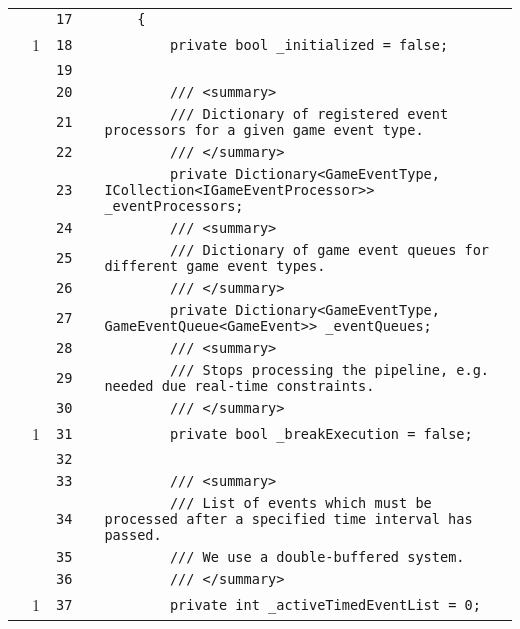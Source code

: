 \documentclass[a4paper,landscape,10pt]{article}
\begin{document}
\begin{longtable}[l]{lrrll}
\cellcolor{gray} &  & \verb~17~ & & \verb~    {~\\
\cellcolor{green} & 1 & \verb~18~ & & \verb~        private bool _initialized = false;~\\
\cellcolor{gray} &  & \verb~19~ & & \verb~~\\
\cellcolor{gray} &  & \verb~20~ & & \verb~        /// <summary>~\\
\cellcolor{gray} &  & \verb~21~ & & \verb~        /// Dictionary of registered event processors for a given game event type.~\\
\cellcolor{gray} &  & \verb~22~ & & \verb~        /// </summary>~\\
\cellcolor{gray} &  & \verb~23~ & & \verb~        private Dictionary<GameEventType, ICollection<IGameEventProcessor>> _eventProcessors;~\\
\cellcolor{gray} &  & \verb~24~ & & \verb~        /// <summary>~\\
\cellcolor{gray} &  & \verb~25~ & & \verb~        /// Dictionary of game event queues for different game event types.~\\
\cellcolor{gray} &  & \verb~26~ & & \verb~        /// </summary>~\\
\cellcolor{gray} &  & \verb~27~ & & \verb~        private Dictionary<GameEventType, GameEventQueue<GameEvent>> _eventQueues;~\\
\cellcolor{gray} &  & \verb~28~ & & \verb~        /// <summary>~\\
\cellcolor{gray} &  & \verb~29~ & & \verb~        /// Stops processing the pipeline, e.g. needed due real-time constraints.~\\
\cellcolor{gray} &  & \verb~30~ & & \verb~        /// </summary>~\\
\cellcolor{green} & 1 & \verb~31~ & & \verb~        private bool _breakExecution = false;~\\
\cellcolor{gray} &  & \verb~32~ & & \verb~~\\
\cellcolor{gray} &  & \verb~33~ & & \verb~        /// <summary>~\\
\cellcolor{gray} &  & \verb~34~ & & \verb~        /// List of events which must be processed after a specified time interval has passed.~\\
\cellcolor{gray} &  & \verb~35~ & & \verb~        /// We use a double-buffered system.~\\
\cellcolor{gray} &  & \verb~36~ & & \verb~        /// </summary>~\\
\cellcolor{green} & 1 & \verb~37~ & & \verb~        private int _activeTimedEventList = 0;~\\

\end{longtable}
\end{document}
